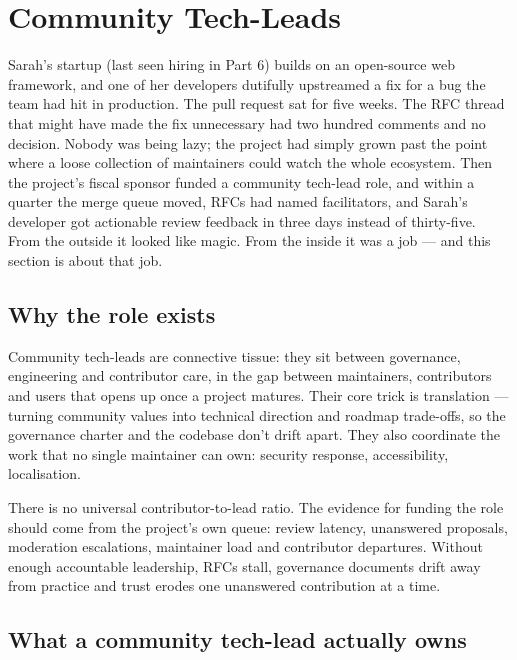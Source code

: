 \section{Community Tech-Leads}
Sarah's startup (last seen hiring in Part 6) builds on an open-source web framework, and one of her developers dutifully upstreamed a fix for a bug the team had hit in production. The pull request sat for five weeks. The RFC thread that might have made the fix unnecessary had two hundred comments and no decision. Nobody was being lazy; the project had simply grown past the point where a loose collection of maintainers could watch the whole ecosystem. Then the project's fiscal sponsor funded a community tech-lead role, and within a quarter the merge queue moved, RFCs had named facilitators, and Sarah's developer got actionable review feedback in three days instead of thirty-five. From the outside it looked like magic. From the inside it was a job — and this section is about that job.



\subsection{Why the role exists}


Community tech-leads are connective tissue: they sit between governance, engineering and contributor care, in the gap between maintainers, contributors and users that opens up once a project matures. Their core trick is translation — turning community values into technical direction and roadmap trade-offs, so the governance charter and the codebase don't drift apart. They also coordinate the work that no single maintainer can own: security response, accessibility, localisation.


There is no universal contributor-to-lead ratio. The evidence for funding the role should come from the project's own queue: review latency, unanswered proposals, moderation escalations, maintainer load and contributor departures. Without enough accountable leadership, RFCs stall, governance documents drift away from practice and trust erodes one unanswered contribution at a time.



\subsection{What a community tech-lead actually owns}


